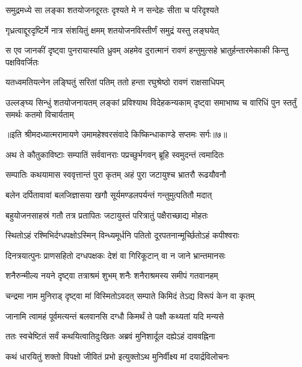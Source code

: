 \twolineshloka
{समुद्रमध्ये सा लङ्का शतयोजनदूरतः}
{दृश्यते मे न सन्देहः सीता च परिदृश्यते} %

\twolineshloka
{गृध्रत्वाद्दूरदृष्टिर्मे नात्र संशयितुं क्षमम्}
{शतयोजनविस्तीर्णं समुद्रं यस्तु लङ्घयेत्} %

\threelineshloka
{स एव जानकीं दृष्ट्वा पुनरायास्यति ध्रुवम्}
{अहमेव दुरात्मानं रावणं हन्तुमुत्सहे}
{भ्रातुर्हन्तारमेकाकी किन्तु पक्षविवर्जितः} %

\twolineshloka
{यतध्वमतियत्नेन लङ्घितुं सरितां पतिम्}
{ततो हन्ता रघुश्रेष्ठो रावणं राक्षसाधिपम्} %

\fourlineindentedshloka
{उल्लङ्घ्य सिन्धुं शतयोजनायतम्}
{लङ्कां प्रविश्याथ विदेहकन्यकाम्}
{दृष्ट्वा समाभाष्य च वारिधिं पुन\-}
{स्तर्तुं समर्थः कतमो विचार्यताम्} %

{॥इति श्रीमदध्यात्मरामायणे उमामहेश्वरसंवादे किष्किन्धाकाण्डे
सप्तमः सर्गः॥७॥
}




\twolineshloka
{अथ ते कौतुकाविष्टाः सम्पातिं सर्ववानराः}
{पप्रच्छुर्भगवन् ब्रूहि स्वमुदन्तं त्वमादितः} %

\twolineshloka
{सम्पातिः कथयामास स्ववृत्तान्तं पुरा कृतम्}
{अहं पुरा जटायुश्च भ्रातरौ रूढयौवनौ} %

\twolineshloka
{बलेन दर्पितावावां बलजिज्ञासया खगौ}
{सूर्यमण्डलपर्यन्तं गन्तुमुत्पतितौ मदात्} %

\twolineshloka
{बहुयोजनसाहस्रं गतौ तत्र प्रतापितः}
{जटायुस्तं परित्रातुं पक्षैराच्छाद्य मोहतः} %

\twolineshloka
{स्थितोऽहं रश्मिभिर्दग्धपक्षोऽस्मिन् विन्ध्यमूर्धनि}
{पतितो दूरपतनान्मूर्च्छितोऽहं कपीश्वराः} %

\twolineshloka
{दिनत्रयात्पुनः प्राणसहितो दग्धपक्षकः}
{देशं वा गिरिकूटान् वा न जाने भ्रान्तमानसः} %

\twolineshloka
{शनैरुन्मील्य नयने दृष्ट्वा तत्राश्रमं शुभम्}
{शनैः शनैराश्रमस्य समीपं गतवानहम्} %

\twolineshloka
{चन्द्रमा नाम मुनिराड् दृष्ट्वा मां विस्मितोऽवदत्}
{सम्पाते किमिदं तेऽद्य विरूपं केन वा कृतम्} %

\twolineshloka
{जानामि त्वामहं पूर्वमत्यन्तं बलवानसि}
{दग्धौ किमर्थं ते पक्षौ कथ्यतां यदि मन्यसे} %

\twolineshloka
{ततः स्वचेष्टितं सर्वं कथयित्वातिदुःखितः}
{अब्रवं मुनिशार्दूल दह्येऽहं दाववह्निना} %

\twolineshloka
{कथं धारयितुं शक्तो विपक्षो जीवितं प्रभो}
{इत्युक्तोऽथ मुनिर्वीक्ष्य मां दयार्द्रविलोचनः} %

